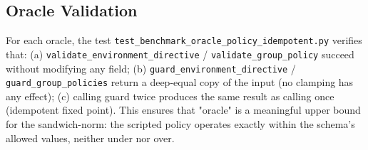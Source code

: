 \subsection{Oracle Validation}

For each oracle, the test
\texttt{test\_benchmark\_oracle\_policy\_idempotent.py} verifies that:
(a) \texttt{validate\_environment\_directive} / \texttt{validate\_group\_policy}
succeed without modifying any field;
(b) \texttt{guard\_environment\_directive} / \texttt{guard\_group\_policies}
return a deep-equal copy of the input (no clamping has any effect);
(c) calling guard twice produces the same result as calling once
(idempotent fixed point).
This ensures that "oracle" is a meaningful upper bound for the
sandwich-norm: the scripted policy operates exactly within the
schema's allowed values, neither under nor over.
